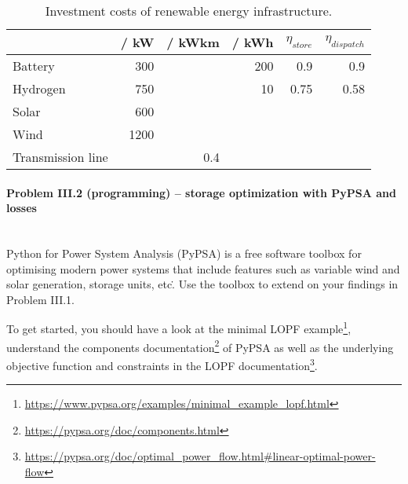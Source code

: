 \documentclass[11pt,a4paper,fleqn]{scrartcl}
\newcommand{\eur}{\text{\EUR{}}}
\begin{document}
\begin{table}[h]
 \centering
 \label{tab:prices}
 \begin{tabular}{@{}lrrrrr@{}}
  \toprule
                             & \eur / kW & \eur / kWkm & \eur / kWh & $\eta_{store}$ & $\eta_{dispatch}$ \\ \midrule
  Battery                    & 300         & & 200          & 0.9            & 0.9               \\
  Hydrogen                   & 750         & & 10           & 0.75           & 0.58              \\
  Solar                      & 600         & &              &                &                   \\
  Wind                       & 1200        & &              &                &                   \\
  Transmission line &          & 0.4 &              &                &                   \\ \bottomrule
 \end{tabular}
 \caption{Investment costs of renewable energy infrastructure.}
\end{table}

\newpage
\paragraph{Problem III.2 (programming) -- storage optimization with PyPSA and losses \faGroup}~\\

Python for Power System Analysis (PyPSA) is a free software toolbox for optimising modern power systems that include features such as variable wind and solar generation, storage units, etc\.. Use the toolbox to extend on your findings in Problem III.1.

To get started, you should have a look at the minimal LOPF example\footnote{\url{https://www.pypsa.org/examples/minimal_example_lopf.html}}, understand  the components documentation\footnote{\url{https://pypsa.org/doc/components.html}} of PyPSA as well as the underlying objective function and constraints in the LOPF documentation\footnote{\url{https://pypsa.org/doc/optimal_power_flow.html\#linear-optimal-power-flow}}.
\end{document}
